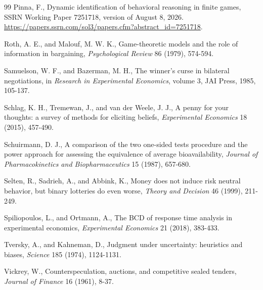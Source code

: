 \documentclass[11pt,a4paper]{article}
\begin{document}
{\begin{thebibliography}{99}
 Pinna, F., Dynamic identification of behavioral reasoning in finite games, SSRN Working Paper 7251718, version of August 8, 2026. \url{https://papers.ssrn.com/sol3/papers.cfm?abstract_id=7251718}.

 Roth, A. E., and Malouf, M. W. K., Game-theoretic models and the role of information in bargaining, \emph{Psychological Review} 86 (1979), 574-594.

 Samuelson, W. F., and Bazerman, M. H., The winner's curse in bilateral negotiations, in \emph{Research in Experimental Economics}, volume 3, JAI Press, 1985, 105-137.

 Schlag, K. H., Tremewan, J., and van der Weele, J. J., A penny for your thoughts: a survey of methods for eliciting beliefs, \emph{Experimental Economics} 18 (2015), 457-490.

 Schuirmann, D. J., A comparison of the two one-sided tests procedure and the power approach for assessing the equivalence of average bioavailability, \emph{Journal of Pharmacokinetics and Biopharmaceutics} 15 (1987), 657-680.

 Selten, R., Sadrieh, A., and Abbink, K., Money does not induce risk neutral behavior, but binary lotteries do even worse, \emph{Theory and Decision} 46 (1999), 211-249.

 Spiliopoulos, L., and Ortmann, A., The BCD of response time analysis in experimental economics, \emph{Experimental Economics} 21 (2018), 383-433.

 Tversky, A., and Kahneman, D., Judgment under uncertainty: heuristics and biases, \emph{Science} 185 (1974), 1124-1131.

 Vickrey, W., Counterspeculation, auctions, and competitive sealed tenders, \emph{Journal of Finance} 16 (1961), 8-37.

\end{thebibliography}
}
\end{document}

